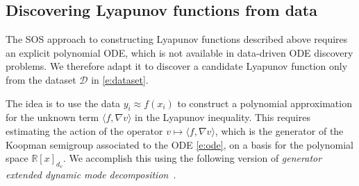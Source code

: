 \documentclass[11pt]{amsart}
\numberwithin{equation}{section}
\theoremstyle{plain}
\theoremstyle{definition}
\theoremstyle{remark}
\newcommand{\R}{\mathbb{R}}
\renewcommand{\vec}[1]{{#1}}
\newcommand{\ip}[2]{\langle #1, #2 \rangle}
\begin{document}
\subsection{Discovering Lyapunov functions from data}
\label{ss:data-driven-lyap}

The SOS approach to constructing Lyapunov functions described above requires an explicit polynomial ODE, which is not available in data-driven ODE discovery problems. We therefore adapt it to discover a candidate Lyapunov function only from the dataset $\mathcal{D}$ in \cref{e:dataset}.

The idea is to use the data $\vec{y}_i \approx \vec{f}(\vec{x}_i)$ to construct a polynomial approximation for the unknown term $\ip{\vec{f}}{\nabla v}$ in the Lyapunov inequality. This requires estimating the action of the operator $v \mapsto \ip{\vec{f}}{\nabla v}$, which is the generator of the Koopman semigroup associated to the ODE \cref{e:ode}, on a basis for the polynomial space $\R[\vec{x}]_{d_v}$. We accomplish this using the following version of \emph{generator extended dynamic mode decomposition}~\cite{williams2015data, klus2020data}.
\end{document}
